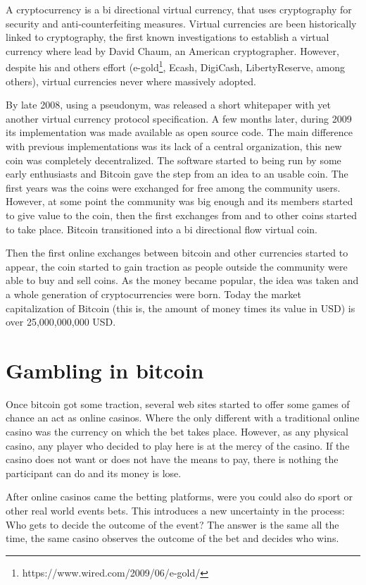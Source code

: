 \begin{intro}
A cryptocurrency is a bi directional virtual currency, that uses cryptography
  for security and anti-counterfeiting measures. Virtual currencies are been
  historically linked to cryptography, the first known investigations
   to establish a virtual currency where lead by David
  Chaum, an American cryptographer. However, despite his and others effort
  (e-gold\footnote{https://www.wired.com/2009/06/e-gold/},
   Ecash,
   DigiCash, LibertyReserve, among others), virtual currencies never where
   massively adopted.
   
By late 2008, using a pseudonym, was released a short
  whitepaper with yet another virtual currency
  protocol specification. A few months later, during 2009 its implementation
  was made available as open source code. The main difference with previous
  implementations was its lack of a central organization, this new coin was
  completely decentralized. The software started to being run by some early
  enthusiasts and Bitcoin gave the step from an idea to an usable coin. The
  first years was the coins were exchanged for free among the community users.
  However, at some point the community was big enough and its members started
  to give value to the coin, then the first exchanges from and to other coins
  started to take place. Bitcoin transitioned into a bi directional flow
  virtual coin.

Then the first online exchanges between bitcoin and other currencies started
  to appear, the coin started to gain traction as people outside the community
  were able to buy and sell coins. As the money became popular, the idea was
  taken and a whole generation of cryptocurrencies were born. Today the
  market capitalization of Bitcoin (this is, the amount of money times its
  value in USD) is over 25,000,000,000 USD.
  
\section{Gambling in bitcoin}
Once bitcoin got some traction, several web sites started to offer some
  games of chance an act as online casinos. Where the only different with a
  traditional online casino was the currency on which the bet takes place.
However, as any physical casino, any player who decided to play here is at
  the mercy of the casino. If the casino does not want or does not have the
  means to pay, there is nothing the participant can do and its money is lose.
 
After online casinos came the betting platforms, were you could also do sport
  or other real world events bets. This introduces a new uncertainty in the
  process: Who gets to decide the outcome of the event? The answer is the same
  all the time, the same casino observes the outcome of the bet and decides
  who wins.
  
  
  

 
 




\end{intro}
